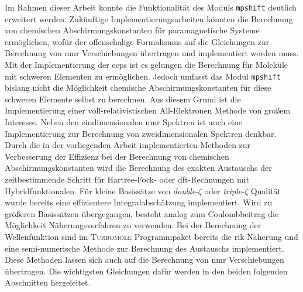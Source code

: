 Im Rahmen dieser Arbeit konnte die Funktionalität des Moduls \texttt{mpshift} deutlich erweitert werden. Zukünftige Implementierungsarbeiten könnten die Berechnung von chemischen Abschirmungskonstanten für paramagnetische Systeme ermöglichen, wofür der offenschalige Formalismus auf die Gleichungen zur Berechnung von \ac{nmr} Verschiebungen übertragen und implementiert werden muss. Mit der Implementierung der \acp{ecp} ist es gelungen die Berechnung für Moleküle mit schweren Elementen zu ermöglichen. Jedoch umfasst das Modul \texttt{mpshift} bislang nicht die Möglichkeit chemische Abschirmungskonstanten für diese schweren Elemente selbst zu berechnen. Aus diesem Grund ist die Implementierung einer voll-relativistischen All-Elektronen Methode von großem Interesse. Neben den eindimensionalen \ac{nmr} Spektren ist auch eine Implementierung zur Berechnung von zweidimensionalen Spektren denkbar.  
Durch die in der vorliegenden Arbeit implementierten Methoden zur Verbesserung der Effizienz bei der Berechnung von chemischen Abschirmungskonstanten wird die Berechnung des exakten Austauschs der zeitbestimmende Schritt für Hartree-Fock- oder \ac{dft}-Rechnungen mit Hybridfunktionalen. Für kleine Basissätze von \textit{double}-$\zeta$ oder \textit{triple}-$\zeta$ Qualität wurde bereits eine effizientere Integralabschätzung implementiert. Wird zu größeren Basissätzen übergegangen, besteht analog zum Coulombbeitrag die Möglichkeit Näherungsverfahren zu verwenden. Bei der Berechnung der Wellenfunktion sind im \textsc{Turbomole} Programmpaket bereits die \ac{rik} Näherung\supercite{weigend2002fully} und eine semi-numerische Methode\supercite{plessow2012seminumerical} zur Berechnung des Austauschs implementiert. Diese Methoden lassen sich auch auf die Berechnung von \ac{nmr} Verschiebungen übertragen. Die wichtigsten Gleichungen dafür werden in den beiden folgenden Abschnitten hergeleitet. 

